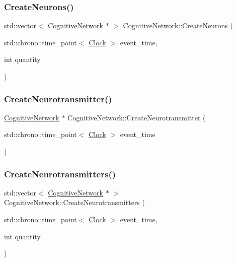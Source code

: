 \mbox{\label{classCognitiveNetwork_af9b2a136584c962e44114a7ee3d2804a}} 
\subsubsection{\texorpdfstring{Create\+Neurons()}{CreateNeurons()}}
{\footnotesize\ttfamily std\+::vector$<$ \mbox{\hyperlink{classCognitiveNetwork}{Cognitive\+Network}} $\ast$ $>$ Cognitive\+Network\+::\+Create\+Neurons (\begin{DoxyParamCaption}\item[{std\+::chrono\+::time\+\_\+point$<$ \mbox{\hyperlink{universe_8h_a0ef8d951d1ca5ab3cfaf7ab4c7a6fd80}{Clock}} $>$}]{event\+\_\+time,  }\item[{int}]{quantity }\end{DoxyParamCaption})}

\mbox{\label{classCognitiveNetwork_a53d1047ae3ec721540b64b05abe01559}} 
\subsubsection{\texorpdfstring{Create\+Neurotransmitter()}{CreateNeurotransmitter()}}
{\footnotesize\ttfamily \mbox{\hyperlink{classCognitiveNetwork}{Cognitive\+Network}} $\ast$ Cognitive\+Network\+::\+Create\+Neurotransmitter (\begin{DoxyParamCaption}\item[{std\+::chrono\+::time\+\_\+point$<$ \mbox{\hyperlink{universe_8h_a0ef8d951d1ca5ab3cfaf7ab4c7a6fd80}{Clock}} $>$}]{event\+\_\+time }\end{DoxyParamCaption})}

\mbox{\label{classCognitiveNetwork_ad877c495c9efdb582613a5af8d854ac3}} 
\subsubsection{\texorpdfstring{Create\+Neurotransmitters()}{CreateNeurotransmitters()}}
{\footnotesize\ttfamily std\+::vector$<$ \mbox{\hyperlink{classCognitiveNetwork}{Cognitive\+Network}} $\ast$ $>$ Cognitive\+Network\+::\+Create\+Neurotransmitters (\begin{DoxyParamCaption}\item[{std\+::chrono\+::time\+\_\+point$<$ \mbox{\hyperlink{universe_8h_a0ef8d951d1ca5ab3cfaf7ab4c7a6fd80}{Clock}} $>$}]{event\+\_\+time,  }\item[{int}]{quantity }\end{DoxyParamCaption})}


